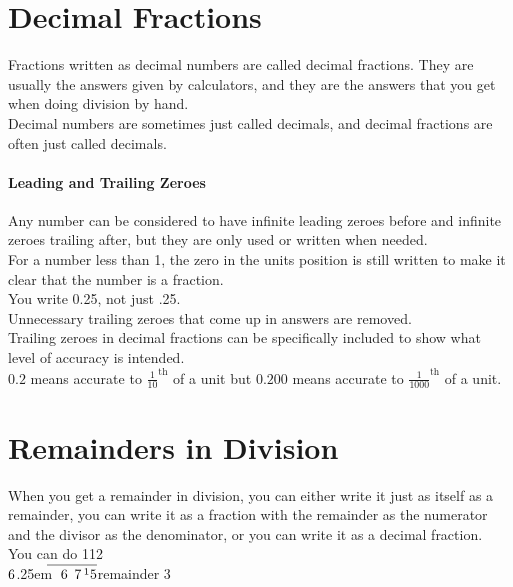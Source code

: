 \documentclass{article}
\newcommand\mylongdiv[2]{%
$\strut#1$\kern.25em\smash{\raise.3ex\hbox{$\big)$}}$\mkern-8mu
        \overline{\quad\strut#2}$}
\begin{document}
\newpage

\section{Decimal Fractions}

Fractions written as decimal numbers are called decimal fractions. They are usually the answers given by calculators, and they are the answers that you get when doing division by hand.\\

Decimal numbers are sometimes just called decimals, and decimal fractions are often just called decimals.\\

\paragraph{Leading and Trailing Zeroes}
Any number can be considered to have infinite leading zeroes before and infinite zeroes trailing after, but they are only used or written when needed.\\

For a number less than 1, the zero in the units position is still written to make it clear that the number is a fraction.\\

You write 0.25, not just .25.\\

Unnecessary trailing zeroes that come up in answers are removed.\\

Trailing zeroes in decimal fractions can be specifically included to show what level of accuracy is intended.\\

$0.2$ means accurate to $\frac{1}{10}^{\textrm{th}}$ of a unit but $0.200$ means accurate to $\frac{1}{1000}^{\textrm{th}}$ of a unit.

\newpage

\section{Remainders in Division}
When you get a remainder in division, you can either write it just as itself as a remainder, you can write it as a fraction with the remainder as the numerator and the divisor as the denominator, or you can write it as a decimal fraction.\\

You can do
\hspace*{4.1ex}1\hspace{1.3ex}1\hspace{0.9ex}2\\
\hspace*{7em}\mylongdiv{6}{6\hspace{1.1ex}7\hspace{0.4ex}{^1}5}\hspace{1em}remainder 3\\
\end{document}

